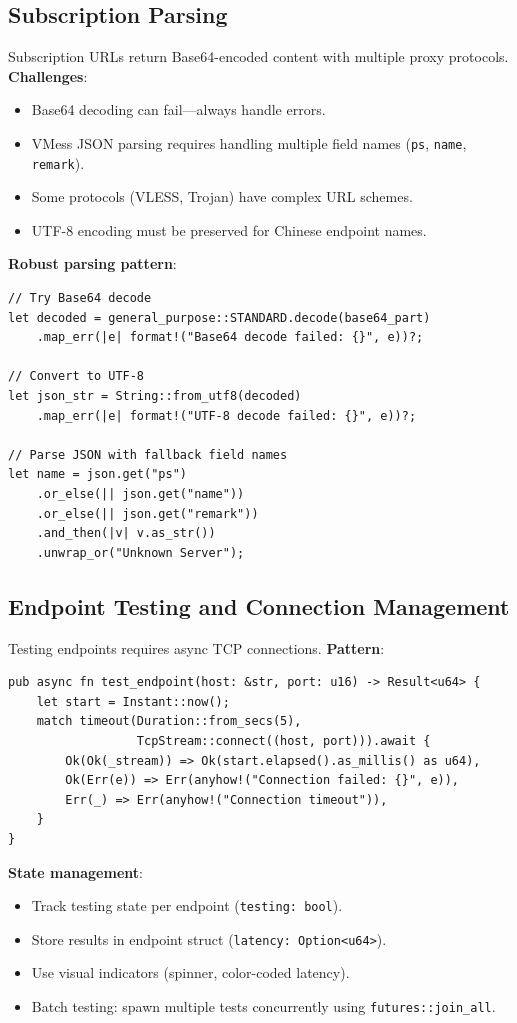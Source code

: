 \subsection{Subscription Parsing}

Subscription URLs return Base64-encoded content with multiple proxy protocols. \textbf{Challenges}:
\begin{itemize}
    \item Base64 decoding can fail—always handle errors.
    \item VMess JSON parsing requires handling multiple field names (\texttt{ps}, \texttt{name}, \texttt{remark}).
    \item Some protocols (VLESS, Trojan) have complex URL schemes.
    \item UTF-8 encoding must be preserved for Chinese endpoint names.
\end{itemize}

\textbf{Robust parsing pattern}:
\begin{verbatim}
// Try Base64 decode
let decoded = general_purpose::STANDARD.decode(base64_part)
    .map_err(|e| format!("Base64 decode failed: {}", e))?;

// Convert to UTF-8
let json_str = String::from_utf8(decoded)
    .map_err(|e| format!("UTF-8 decode failed: {}", e))?;

// Parse JSON with fallback field names
let name = json.get("ps")
    .or_else(|| json.get("name"))
    .or_else(|| json.get("remark"))
    .and_then(|v| v.as_str())
    .unwrap_or("Unknown Server");
\end{verbatim}

\subsection{Endpoint Testing and Connection Management}

Testing endpoints requires async TCP connections. \textbf{Pattern}:
\begin{verbatim}
pub async fn test_endpoint(host: &str, port: u16) -> Result<u64> {
    let start = Instant::now();
    match timeout(Duration::from_secs(5), 
                  TcpStream::connect((host, port))).await {
        Ok(Ok(_stream)) => Ok(start.elapsed().as_millis() as u64),
        Ok(Err(e)) => Err(anyhow!("Connection failed: {}", e)),
        Err(_) => Err(anyhow!("Connection timeout")),
    }
}
\end{verbatim}

\textbf{State management}:
\begin{itemize}
    \item Track testing state per endpoint (\texttt{testing: bool}).
    \item Store results in endpoint struct (\texttt{latency: Option<u64>}).
    \item Use visual indicators (spinner, color-coded latency).
    \item Batch testing: spawn multiple tests concurrently using \texttt{futures::join\_all}.
\end{itemize}

